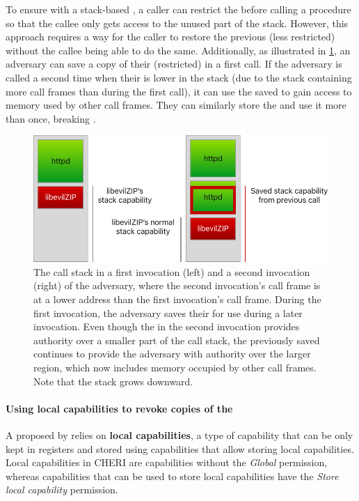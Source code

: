 \documentclass[main.tex]{subfiles}
\begin{document}
To ensure  with a stack-based , a caller can restrict the  before calling a procedure so that the callee only gets access to the unused part of the stack. However, this approach requires a way for the caller to restore the previous (less restricted)  without the callee being able to do the same. Additionally, as illustrated in \cref{fig:savedstackcap}, an adversary can save a copy of their (restricted)  in a first call. If the adversary is called a second time when their  is lower in the stack (due to the stack containing more call frames than during the first call), it can use the saved  to gain access to memory used by other call frames. They can similarly store the  and use it more than once, breaking .

\begin{figure}
	\begin{center}
		\includegraphics{Images/Saved Stack Cap.pdf}
	\end{center}
	\caption{The call stack in a first invocation (left) and a second invocation (right) of the adversary, where the second invocation's call frame is at a lower address than the first invocation's call frame. During the first invocation, the adversary saves their  for use during a later invocation. Even though the  in the second invocation provides authority over a smaller part of the call stack, the previously saved  continues to provide the adversary with authority over the larger region, which now includes memory occupied by other call frames. Note that the stack grows downward.}
	\label{fig:savedstackcap}
\end{figure}

\paragraph{Using local capabilities to revoke copies of the } A  proposed by \cite{retptr} relies on \textbf{local capabilities}, a type of capability that can be only kept in registers and stored using capabilities that allow storing local capabilities. Local capabilities in CHERI are capabilities without the \emph{Global} permission, whereas capabilities that can be used to store local capabilities have the \emph{Store local capability} permission.
\end{document}
